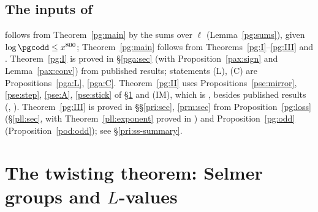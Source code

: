 \documentclass[10pt]{amsart}
\theoremstyle{definition}
\theoremstyle{remark}
\newcommand{\Z}{\mathbb Z}
\begin{document}
\subsection{The inputs of \texorpdfstring{{\cite[Proposition~14.40]{P46}}}{[Row D, Proposition~14.40]}}\label{pg:ss-summary}

{\cite[Proposition~14.40]{P46}} follows from Theorem~\ref{pg:main} by the sums over $\ell$ (Lemma~\ref{pg:sums}),
given $\log\pgcodd\le x^{800}$; Theorem~\ref{pg:main} follows from Theorems~\ref{pg:I}--\ref{pg:III} and
{\cite[Proposition~14.36]{P46}}. Theorem~\ref{pg:I} is proved in \S\ref{pga:sec} (with Proposition~\ref{pax:sign} and
Lemma~\ref{pax:conv}) from published results; statements (L), (C) are Propositions~\ref{pga:L}, \ref{pga:C}.
Theorem~\ref{pg:II} uses Propositions~\ref{pse:mirror}, \ref{pse:step}, \ref{pse:A}, \ref{pse:stick} of
\S\ref{pse:sec} and (IM), which is {\cite[Propositions~3.8 and~3.12]{P54}}, besides published results
(\cite{BlochKato}, \cite{NSW}). Theorem~\ref{pg:III} is proved in \S\S\ref{pri:sec}, \ref{prm:sec} from
Proposition~\ref{pg:loss} (\S\ref{pll:sec}, with Theorem~\ref{pll:exponent} proved in {\cite[\S2.3]{P56}}) and
Proposition~\ref{pg:odd} (Proposition~\ref{pod:odd}); see \S\ref{pri:ss-summary}.




\providecommand{\auO}{\mathcal O}
\providecommand{\auNm}{\operatorname{Nm}}
\providecommand{\auU}{\mathrm U}
\providecommand{\auA}{\mathbb A}
\providecommand{\auF}{\mathbb F}
\providecommand{\aubar}[1]{\overline{#1}}
\providecommand{\auf}[1]{\texttt{#1}}
\providecommand{\panot}[1]{\par\smallskip{\raggedright\noindent\textbf{[Not proved here:} #1\textbf{]}\par}\smallskip}
\providecommand{\pgZb}{\overline{\Z}_\ell}
\providecommand{\pgv}{v}
\providecommand{\pgNch}{N_{\mathrm{ch}}}
\providecommand{\pgG}{G_E}
\providecommand{\pgSel}{\operatorname{Sel}}
\providecommand{\pglen}{\operatorname{len}}
\providecommand{\pgHom}{\operatorname{Hom}}
\providecommand{\pgS}{S_{\mathrm{bad}}}
\providecommand{\pgcyc}{\varepsilon_\ell}
\providecommand{\pseinv}{\operatorname{inv}}
\providecommand{\pseev}{\operatorname{ev}}
\providecommand{\pseCl}{\mathrm{Cl}}
\providecommand{\pseArt}{\operatorname{Art}}

\section{The twisting theorem: Selmer groups and \texorpdfstring{$L$}{L}-values}\label{pse:sec}
\end{document}
